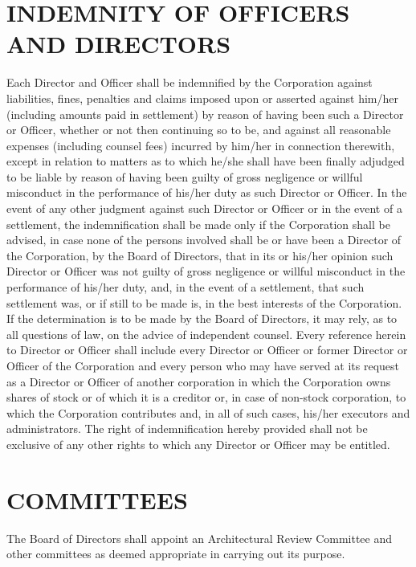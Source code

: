 \documentclass[10pt, letterpaper]{article}
\begin{document}
\section{INDEMNITY OF OFFICERS AND DIRECTORS}
Each Director and Officer shall be indemnified by the Corporation against liabilities, fines, penalties and claims imposed upon or asserted against him/her (including amounts paid in settlement) by reason of having been such a Director or Officer, whether or not then continuing so to be, and against all reasonable expenses (including counsel fees) incurred by him/her in connection therewith, except in relation to matters as to which he/she shall have been finally adjudged to be liable by reason of having been guilty of gross negligence or willful misconduct in the performance of his/her duty as such Director or Officer.
In the event of any other judgment against such Director or Officer or in the event of a settlement, the indemnification shall be made only if the Corporation shall be advised, in case none of the persons involved shall be or have been a Director of the Corporation, by the Board of Directors, that in its or his/her opinion such Director or Officer was not guilty of gross negligence or willful misconduct in the performance of his/her duty, and, in the event of a settlement, that such settlement was, or if still to be made is, in the best interests of the Corporation.
If the determination is to be made by the Board of Directors, it may rely, as to all questions of law, on the advice of independent counsel.
Every reference herein to Director or Officer shall include every Director or Officer or former Director or Officer of the Corporation and every person who may have served at its request as a Director or Officer of another corporation in which the Corporation owns shares of stock or of which it is a creditor or, in case of non-stock corporation, to which the Corporation contributes and, in all of such cases, his/her executors and administrators.
The right of indemnification hereby provided shall not be exclusive of any other rights to which any Director or Officer may be entitled.

\section{COMMITTEES}
The Board of Directors shall appoint an Architectural Review Committee and other committees as deemed appropriate in carrying out its purpose.
\end{document}
